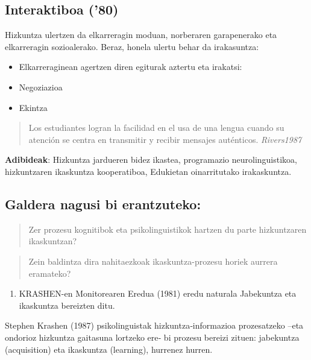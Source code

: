 \documentclass[
]{book}
\providecommand{\tightlist}{%
  \setlength{\itemsep}{0pt}\setlength{\parskip}{0pt}}
\begin{document}
\hypertarget{interaktiboa-80}{%
\subsection{Interaktiboa ('80)}\label{interaktiboa-80}}

Hizkuntza ulertzen da elkarreragin moduan, norberaren garapenerako eta elkarreragin sozioalerako. Beraz, honela ulertu behar da irakasuntza:

\begin{itemize}
\tightlist
\item
  Elkarreraginean agertzen diren egiturak aztertu eta irakatsi:
\item
  Negoziazioa
\item
  Ekintza
\end{itemize}

\begin{quote}
Los estudiantes logran la facilidad en el usa de una lengua cuando su atención se centra en transmitir y recibir mensajes auténticos.
\emph{Rivers1987}
\end{quote}

\textbf{Adibideak}: Hizkuntza jardueren bidez ikastea, programazio neurolinguistikoa, hizkuntzaren ikaskuntza kooperatiboa, Edukietan oinarritutako irakaskuntza.

\hypertarget{galdera-nagusi-bi-erantzuteko}{%
\subsection{Galdera nagusi bi erantzuteko:}\label{galdera-nagusi-bi-erantzuteko}}

\begin{quote}
Zer prozesu kognitibok eta psikolinguistikok hartzen du parte hizkuntzaren ikaskuntzan?
\end{quote}

\begin{quote}
Zein baldintza dira nahitaezkoak ikaskuntza-prozesu horiek aurrera eramateko?
\end{quote}

\begin{enumerate}
\def\labelenumi{\arabic{enumi}.}
\tightlist
\item
  KRASHEN-en Monitorearen Eredua (1981) eredu naturala
  Jabekuntza eta ikaskuntza bereizten ditu.
\end{enumerate}

Stephen Krashen (1987) psikolinguistak hizkuntza‐informazioa prozesatzeko --eta ondorioz hizkuntza gaitasuna lortzeko ere‐ bi prozesu bereizi zituen: jabekuntza (acquisition) eta ikaskuntza (learning), hurrenez hurren.
\end{document}
